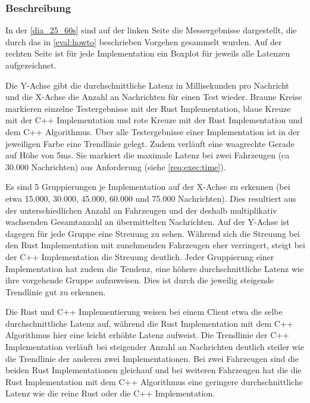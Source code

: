 
\subsubsection{Beschreibung}
In der \autoref{dia_25_60s} sind auf der linken Seite die Messergebnisse dargestellt, die durch das in \autoref{eval:howto} beschrieben Vorgehen gesammelt wurden.
Auf der rechten Seite ist für jede Implementation ein Boxplot für jeweils alle Latenzen aufgezeichnet.

Die Y-Achse gibt die durchschnittliche Latenz in Millisekunden pro Nachricht und die X-Achse die Anzahl an Nachrichten für einen Test wieder.
Braune Kreise markieren einzelne Testergebnisse mit der Rust Implementation, blaue Kreuze mit der C++ Implementation und rote Kreuze mit der Rust Implementation und dem C++ Algorithmus.
Über alle Testergebnisse einer Implementation ist in der jeweiligen Farbe eine Trendlinie gelegt.
Zudem verläuft eine waagrechte Gerade auf Höhe von 5ms. Sie markiert die maximale Latenz bei zwei Fahrzeugen (ca 30.000 Nachrichten) aus Anforderung  (siehe \autoref{req:exec:time}).

Es sind 5 Gruppierungen je Implementation auf der X-Achse zu erkennen (bei etwa 15.000, 30.000, 45.000, 60.000 und 75.000 Nachrichten).
Dies resultiert aus der unterschiedlichen Anzahl an Fahrzeugen und der deshalb multiplikativ wachsenden Gesamtanzahl an übermittelten Nachrichten.
Auf der Y-Achse ist dagegen für jede Gruppe eine Streuung zu sehen.
Während sich die Streuung bei den Rust Implementation mit zunehmenden Fahrzeugen eher verringert, steigt bei der C++ Implementation die Streuung deutlich.
Jeder Gruppierung einer Implementation hat zudem die Tendenz, eine höhere durchschnittliche Latenz wie ihre vorgehende Gruppe aufzuweisen.
Dies ist durch die jeweilig steigende Trendlinie gut zu erkennen.

Die Rust und C++ Implementierung weisen bei einem Client etwa die selbe durchschnittliche Latenz auf, während die Rust Implementation mit dem C++ Algorithmus hier eine leicht erhöhte Latenz aufweist.
Die Trendlinie der C++ Implementation verläuft bei steigender Anzahl an Nachrichten deutlich steiler wie die Trendlinie der anderen zwei Implementationen.
Bei zwei Fahrzeugen sind die beiden Rust Implementationen gleichauf und bei weiteren Fahrzeugen hat die die Rust Implementation mit dem C++ Algorithmus eine geringere durchschnittliche Latenz wie die reine Rust oder die C++ Implementation.

